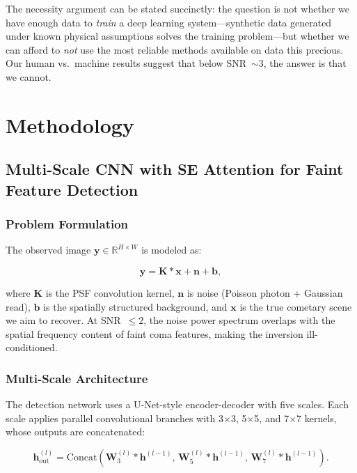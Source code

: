 \documentclass[usenatbib]{mnras}
\begin{document}
The necessity argument can be stated succinctly: the question is not whether we have enough data to \textit{train} a deep learning system---synthetic data generated under known physical assumptions solves the training problem---but whether we can afford to \textit{not} use the most reliable methods available on data this precious. Our human vs.\ machine results suggest that below SNR~$\sim 3$, the answer is that we cannot.

\section{Methodology}\label{sec:methods}

\subsection{Multi-Scale CNN with SE Attention for Faint Feature Detection}

\subsubsection{Problem Formulation}

The observed image $\mathbf{y} \in \mathbb{R}^{H \times W}$ is modeled as:

\begin{equation}\label{eq:forward_model}
\mathbf{y} = \mathbf{K} * \mathbf{x} + \mathbf{n} + \mathbf{b},
\end{equation}

where $\mathbf{K}$ is the PSF convolution kernel, $\mathbf{n}$ is noise (Poisson photon + Gaussian read), $\mathbf{b}$ is the spatially structured background, and $\mathbf{x}$ is the true cometary scene we aim to recover. At SNR~$\leq 2$, the noise power spectrum overlaps with the spatial frequency content of faint coma features, making the inversion ill-conditioned.

\subsubsection{Multi-Scale Architecture}

The detection network uses a U-Net-style encoder-decoder \citep{ronneberger15} with five scales. Each scale applies parallel convolutional branches with 3$\times$3, 5$\times$5, and 7$\times$7 kernels, whose outputs are concatenated:

\begin{equation}\label{eq:multi_kernel}
\mathbf{h}_{\text{out}}^{(l)} = \text{Concat}\left(\mathbf{W}_3^{(l)} * \mathbf{h}^{(l-1)},\, \mathbf{W}_5^{(l)} * \mathbf{h}^{(l-1)},\, \mathbf{W}_7^{(l)} * \mathbf{h}^{(l-1)}\right).
\end{equation}
\end{document}
